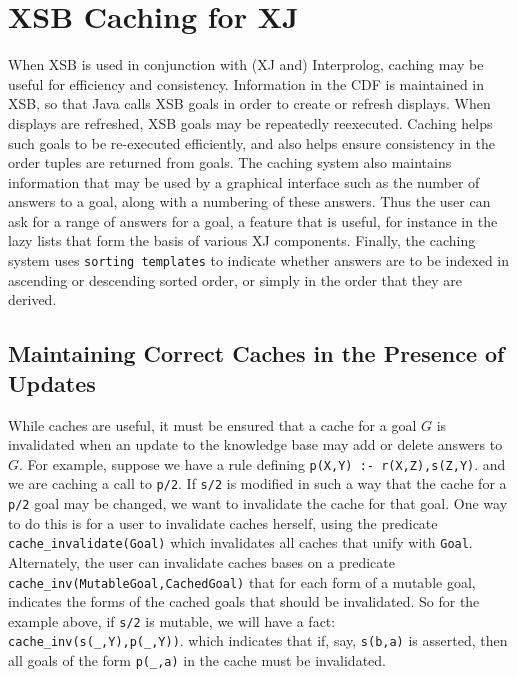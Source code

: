 \section{XSB Caching for XJ}
	   
When XSB is used in conjunction with (XJ and) Interprolog, caching may
be useful for efficiency and consistency.  Information in the CDF is
maintained in XSB, so that Java calls XSB goals in order to create or
refresh displays.  When displays are refreshed, XSB goals may be
repeatedly reexecuted.  Caching helps such goals to be re-executed
efficiently, and also helps ensure consistency in the order tuples are
returned from goals.  The caching system also maintains information
that may be used by a graphical interface such as the number of
answers to a goal, along with a numbering of these answers.  Thus the
user can ask for a range of answers for a goal, a feature that is
useful, for instance in the lazy lists that form the basis of various
XJ components.  Finally, the caching system uses {\tt sorting templates}
to indicate whether answers are to be indexed in ascending or
descending sorted order, or simply in the order that they are derived.

\subsection{Maintaining Correct Caches in the Presence of Updates}
\label{sec:cache-maint}

While caches are useful, it must be ensured that a cache for a goal
$G$ is invalidated when an update to the knowledge base may add or
delete answers to $G$.  For example, suppose we have a rule defining
{\tt p(X,Y) :- r(X,Z),s(Z,Y)}. and we are caching a call to {\tt p/2}.
If {\tt s/2} is modified in such a way that the cache for a {\tt p/2}
goal may be changed, we want to invalidate the cache for that goal.
One way to do this is for a user to invalidate caches herself, using
the predicate {\tt cache\_invalidate(Goal)} which invalidates all
caches that unify with {\tt Goal}.  Alternately, the user can
invalidate caches bases on a predicate {\tt
cache\_inv(MutableGoal,CachedGoal)} that for each form of a mutable
goal, indicates the forms of the cached goals that should be
invalidated.  So for the example above, if {\tt s/2} is mutable, we
will have a fact: {\tt cache\_inv(s(\_,Y),p(\_,Y))}. which indicates
that if, say, {\tt s(b,a)} is asserted, then all goals of the form
{\tt p(\_,a)} in the cache must be invalidated.

